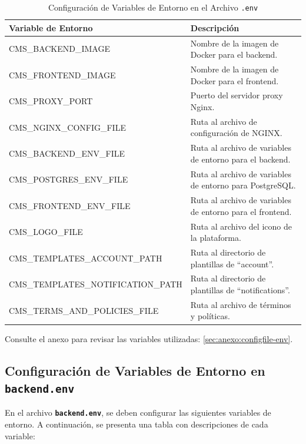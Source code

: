 \begin{table}[H]
    \centering
    \begin{tabular}{|l|p{7cm}|}
    \hline
    \textbf{Variable de Entorno} & \textbf{Descripción} \\
    \hline
    CMS\_BACKEND\_IMAGE & Nombre de la imagen de Docker para el backend. \\
    \hline
    CMS\_FRONTEND\_IMAGE & Nombre de la imagen de Docker para el frontend.\\
    \hline
    CMS\_PROXY\_PORT & Puerto del servidor proxy Nginx. \\
    \hline
    CMS\_NGINX\_CONFIG\_FILE & Ruta al archivo de configuración de NGINX. \\
    \hline
    CMS\_BACKEND\_ENV\_FILE & Ruta al archivo de variables de entorno para el backend. \\
    \hline
    CMS\_POSTGRES\_ENV\_FILE & Ruta al archivo de variables de entorno para PostgreSQL. \\
    \hline
    CMS\_FRONTEND\_ENV\_FILE & Ruta al archivo de variables de entorno para el frontend. \\
    \hline
    CMS\_LOGO\_FILE & Ruta al archivo del icono de la plataforma. \\
    \hline
    CMS\_TEMPLATES\_ACCOUNT\_PATH & Ruta al directorio de plantillas de ``account''. \\
    \hline
    CMS\_TEMPLATES\_NOTIFICATION\_PATH & Ruta al directorio de plantillas de ``notifications''.\\
    \hline
    CMS\_TERMS\_AND\_POLICIES\_FILE & Ruta al archivo de términos y políticas. \\
    \hline
    \end{tabular}
    \caption{Configuración de Variables de Entorno en el Archivo \texttt{.env}}
    \label{tab:env-file-variables}
\end{table}

Consulte el anexo para revisar las variables utilizadas: \ref{sec:anexo:configfile-env}.


\subsection{Configuración de Variables de Entorno en \texttt{backend.env}}

En el archivo \texttt{\textbf{backend.env}}, se deben configurar las siguientes variables de entorno. A continuación, se presenta una tabla con descripciones de cada variable:

